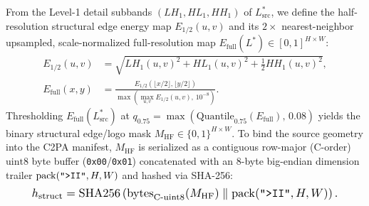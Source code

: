 \documentclass[conference,10pt]{IEEEtran}
\begin{document}
From the Level-1 detail subbands $(LH_1, HL_1, HH_1)$ of $L^*_{\text{src}}$, we define the half-resolution structural edge energy map $E_{1/2}(u,v)$ and its $2\times$ nearest-neighbor upsampled, scale-normalized full-resolution map $E_{\text{full}}(L^*) \in [0, 1]^{H \times W}$:
\begin{equation}
\label{eq:edge_map}
\begin{aligned}
E_{1/2}(u,v) &= \sqrt{LH_1(u,v)^2 + HL_1(u,v)^2 + \tfrac{1}{2} HH_1(u,v)^2}, \\
E_{\text{full}}(x,y) &= \frac{E_{1/2}(\lfloor x/2 \rfloor, \lfloor y/2 \rfloor)}{\max\left(\max_{u,v} E_{1/2}(u,v),\, 10^{-8}\right)}.
\end{aligned}
\end{equation}
Thresholding $E_{\text{full}}(L^*_{\text{src}})$ at $q_{0.75} = \max(\mathrm{Quantile}_{0.75}(E_{\text{full}}),\, 0.08)$ yields the binary structural edge/logo mask $M_{\text{HF}} \in \{0, 1\}^{H \times W}$. To bind the source geometry into the C2PA manifest, $M_{\text{HF}}$ is serialized as a contiguous row-major (C-order) $\mathrm{uint8}$ byte buffer (\texttt{0x00}/\texttt{0x01}) concatenated with an 8-byte big-endian dimension trailer $\mathrm{pack}(\text{\texttt{">II"}}, H, W)$ and hashed via SHA-256:
\begin{equation}
\label{eq:mask_hash}
\resizebox{0.89\columnwidth}{!}{$\displaystyle
h_{\text{struct}} = \mathrm{SHA256}\left(\mathrm{bytes}_{\text{C-uint8}}(M_{\text{HF}}) \;\|\; \mathrm{pack}(\text{\texttt{">II"}}, H, W)\right).
$}
\end{equation}
\end{document}
